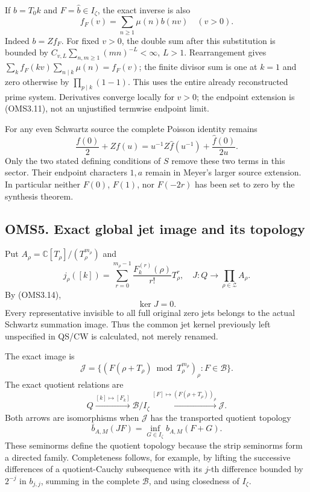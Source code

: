 If \(b=T_0k\) and \(F=\widehat b\in I_\zeta\), the exact inverse is also
\[
f_F(v)=\sum_{n\ge1}\mu(n)b(nv)\quad(v>0).
\tag{OMS4.2}
\] Indeed \(b=Zf_F\). For fixed \(v>0\), the double sum after this
substitution is bounded by \(C_{v,L}\sum_{n,m\ge1}(mn)^{-L}<\infty\),
\(L>1\). Rearrangement gives
\(\sum_k f_F(kv)\sum_{n\mid k}\mu(n)=f_F(v)\); the finite divisor sum is
one at \(k=1\) and zero otherwise by \(\prod_{p\mid k}(1-1)\). This uses
the entire already reconstructed prime system. Derivatives converge
locally for \(v>0\); the endpoint extension is (OMS3.11), not an
unjustified termwise endpoint limit.

For any even Schwartz source the complete Poisson identity remains \[
\frac{f(0)}2+Zf(u)=u^{-1}Z\widehat f(u^{-1})
+\frac{\widehat f(0)}{2u}.
\tag{OMS4.3}
\] Only the two stated defining conditions of \(S\) remove these two
terms in this sector. Their endpoint characters \(1,a\) remain in
Meyer's larger source extension. In particular neither \(F(0)\),
\(F(1)\), nor \(F(-2r)\) has been set to zero by the synthesis theorem.

\subsection{OMS5. Exact global jet image and its
topology}\label{oms5.-exact-global-jet-image-and-its-topology}

Put \(A_\rho=\mathbb C[T_\rho]/(T_\rho^{m_\rho})\) and \[
j_\rho([k])=\sum_{r=0}^{m_\rho-1}
\frac{F_k^{(r)}(\rho)}{r!}T_\rho^r,\quad
J:Q\longrightarrow\prod_{\rho\in\mathcal Z}A_\rho.
\tag{OMS5.1}
\] By (OMS3.14), \[
\boxed{\ker J=0.}
\tag{OMS5.2}
\] Every representative invisible to all full original zero jets belongs
to the actual Schwartz summation image. Thus the common jet kernel
previously left unspecified in QS/CW is calculated, not merely renamed.

The exact image is \[
\mathscr J=\{(F(\rho+T_\rho)\bmod T_\rho^{m_\rho})_\rho:F\in\mathcal B\}.
\tag{OMS5.3}
\] The exact quotient relations are \[
Q\xrightarrow{[k]\mapsto[F_k]}\mathcal B/I_\zeta
\xrightarrow{[F]\mapsto(F(\rho+T_\rho))_\rho}\mathscr J.
\tag{OMS5.4}
\] Both arrows are isomorphisms when \(\mathscr J\) has the transported
quotient topology \[
\bar b_{A,M}(JF)=\inf_{G\in I_\zeta}b_{A,M}(F+G).
\tag{OMS5.5}
\] These seminorms define the quotient topology because the strip
seminorms form a directed family. Completeness follows, for example, by
lifting the successive differences of a quotient-Cauchy subsequence with
its \(j\)-th difference bounded by \(2^{-j}\) in \(b_{j,j}\), summing in
the complete \(\mathcal B\), and using closedness of \(I_\zeta\).

